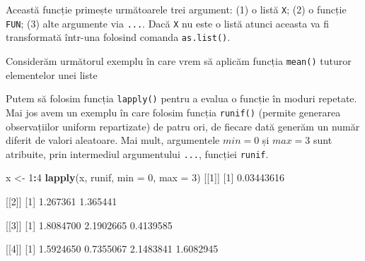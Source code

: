 \documentclass[]{article}
\newenvironment{Shaded}{\begin{snugshade}}{\end{snugshade}}
\newcommand{\KeywordTok}[1]{\textcolor[rgb]{0.13,0.29,0.53}{\textbf{#1}}}
\newcommand{\DataTypeTok}[1]{\textcolor[rgb]{0.13,0.29,0.53}{#1}}
\newcommand{\DecValTok}[1]{\textcolor[rgb]{0.00,0.00,0.81}{#1}}
\newcommand{\FloatTok}[1]{\textcolor[rgb]{0.00,0.00,0.81}{#1}}
\newcommand{\StringTok}[1]{\textcolor[rgb]{0.31,0.60,0.02}{#1}}
\newcommand{\OperatorTok}[1]{\textcolor[rgb]{0.81,0.36,0.00}{\textbf{#1}}}
\newcommand{\NormalTok}[1]{#1}
\begin{document}
Această funcție primește următoarele trei argument: (1) o listă
\texttt{X}; (2) o funcție \texttt{FUN}; (3) alte argumente via
\texttt{...}. Dacă \texttt{X} nu este o listă atunci aceasta va fi
transformată într-una folosind comanda \texttt{as.list()}.

Considerăm următorul exemplu în care vrem să aplicăm funcția
\texttt{mean()} tuturor elementelor unei liste

\begin{Shaded}
\end{Shaded}

Putem să folosim funcția \texttt{lapply()} pentru a evalua o funcție în
moduri repetate. Mai jos avem un exemplu în care folosim funcția
\texttt{runif()} (permite generarea observațiilor uniform repartizate)
de patru ori, de fiecare dată generăm un număr diferit de valori
aleatoare. Mai mult, argumentele \(min=0\) și \(max=3\) sunt atribuite,
prin intermediul argumentului \texttt{...}, funcției \texttt{runif}.

\begin{Shaded}
\begin{Highlighting}[]
\NormalTok{x <-}\StringTok{ }\DecValTok{1}\OperatorTok{:}\DecValTok{4}
\KeywordTok{lapply}\NormalTok{(x, runif, }\DataTypeTok{min =} \DecValTok{0}\NormalTok{, }\DataTypeTok{max =} \DecValTok{3}\NormalTok{)}
\NormalTok{[[}\DecValTok{1}\NormalTok{]]}
\NormalTok{[}\DecValTok{1}\NormalTok{] }\FloatTok{0.03443616}

\NormalTok{[[}\DecValTok{2}\NormalTok{]]}
\NormalTok{[}\DecValTok{1}\NormalTok{] }\FloatTok{1.267361} \FloatTok{1.365441}

\NormalTok{[[}\DecValTok{3}\NormalTok{]]}
\NormalTok{[}\DecValTok{1}\NormalTok{] }\FloatTok{1.8084700} \FloatTok{2.1902665} \FloatTok{0.4139585}

\NormalTok{[[}\DecValTok{4}\NormalTok{]]}
\NormalTok{[}\DecValTok{1}\NormalTok{] }\FloatTok{1.5924650} \FloatTok{0.7355067} \FloatTok{2.1483841} \FloatTok{1.6082945}
\end{Highlighting}
\end{Shaded}
\end{document}
